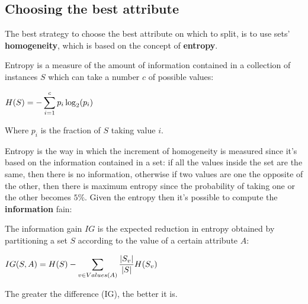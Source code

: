\subsection{Choosing the best attribute}
The best strategy to choose the best attribute on which to split, is to use sets' \textbf{homogeneity}, which is based on the concept of \textbf{entropy}.
\begin{definition}[Entropy]
Entropy is a measure of the amount of information contained in a collection of instances $S$ which can take a number $c$ of possible values:
\begin{center}
	$\displaystyle H(S)=-\displaystyle\sum_{i=1}^cp_i\log_2(p_i)$
\end{center}
Where $p_i$ is the fraction of $S$ taking value $i$. 
\end{definition}
Entropy is the way in which the increment of homogeneity is measured since it's based on the information contained in a set: if all the values inside the set are the same, then there is no information, otherwise if two values are one the opposite of the other, then there is maximum entropy since the probability of taking one or the other becomes $5\%$.\newline
Given the entropy then it's possible to compute the \textbf{information} fain:
\begin{definition}
The information gain $IG$ is the expected reduction in entropy obtained by partitioning a set $S$ according to the value of a certain attribute $A$:
\begin{center}
	$\displaystyle IG(S, A)=H(S)-\displaystyle\sum_{v\in Values(A)}\frac{\vert S_v \vert}{\vert S \vert}H(S_v)$
\end{center}
\end{definition}
The greater the difference (IG), the better it is.
%
%
